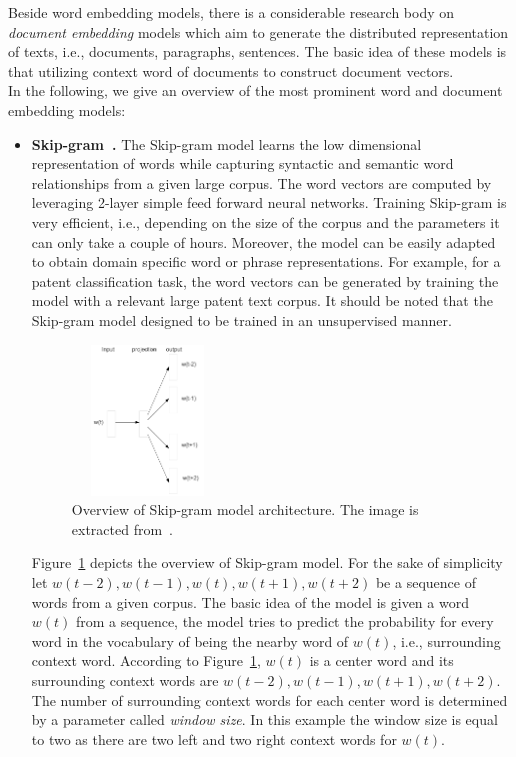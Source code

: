 Beside word embedding models, there is a considerable research body on \textit{document embedding} models which aim to generate the distributed representation of texts, i.e., documents, paragraphs, sentences. The basic idea of these models is that utilizing context word of documents to construct document vectors. \\
In the following, we give an overview of the most prominent word and document embedding models: \\
\begin{itemize}

\item \textbf{Skip-gram~\cite{DBLP:journals/corr/abs-1301-3781}.} The Skip-gram model learns the low dimensional representation of words while capturing syntactic and semantic word relationships from a given large corpus. The word vectors are computed by leveraging 2-layer simple feed forward neural networks. Training Skip-gram is very efficient, i.e., depending on the size of the corpus and the parameters it can only take a couple of hours. Moreover, the model can be easily adapted to obtain domain specific word or phrase representations. For example, for a patent classification task, the word vectors can be generated by training the model with a relevant large patent text corpus.
It should be noted that the Skip-gram model designed to be trained in an unsupervised manner.
\begin{figure}[h]
\centering
 \includegraphics[height=4cm,width=4cm]{Figures/fig_skip_gram.png}
 \caption{Overview of Skip-gram model architecture. The image is extracted from~\protect\cite{DBLP:journals/corr/abs-1301-3781}.}
 \label{fig:skip_gram}
\end{figure} 


Figure~\ref{fig:skip_gram} depicts the overview of Skip-gram model. For the sake of simplicity let $w(t-2),  w(t-1), w(t),  w(t+1), w(t+2)$ be a sequence of words from a given corpus. The basic idea of the model is given a word  $w(t)$ from a sequence, the model tries to predict the  probability for every word in the vocabulary of being the nearby word of $w(t)$, i.e., surrounding context word. According to Figure~\ref{fig:skip_gram}, $w(t)$ is a center word and its surrounding context words are $w(t-2), w(t-1), w(t+1), w(t+2)$. The number of surrounding context words for each center word is determined by a parameter called \textit{window size}. In this example the window size is equal to two as there are two left and two right context words for $w(t)$. 


\end{itemize}
